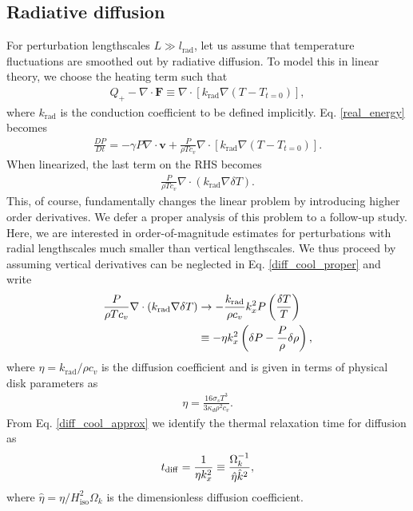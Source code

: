\subsection{Radiative diffusion}
For perturbation lengthscales $L\gg l_\mathrm{rad}$, let us assume that
temperature fluctuations are smoothed out by radiative diffusion. To
model this in linear theory, we choose the heating term such that
\begin{align}
  Q_+ - \nabla\cdot\bm{F} \equiv \nabla\cdot\left[k_\mathrm{rad}\nabla
    \left(T-T_{t=0}\right)\right], 
\end{align} 
where $k_\mathrm{rad}$ is the conduction coefficient to be defined
implicitly. Eq. \ref{real_energy} becomes
\begin{align}
  \frac{DP}{Dt} = -\gamma P \nabla\cdot\bm{v} + \frac{P}{\rho T
    c_v}\nabla\cdot\left[k_\mathrm{rad}\nabla\left(T-T_{t=0}\right)\right].     
\end{align}
When linearized, the last term on the RHS becomes
\begin{align}\label{diff_cool_proper}
  \frac{P}{\rho T c_v} \nabla\cdot\left(k_\mathrm{rad}\nabla\delta
    T\right). 
\end{align}
This, of course, fundamentally changes the linear problem by
introducing higher order derivatives. We defer a proper analysis of
this problem to a follow-up study. Here, we are interested in
order-of-magnitude estimates for perturbations with radial
lengthscales much smaller than vertical lengthscales. We thus proceed
by assuming vertical derivatives can be neglected in
Eq. \ref{diff_cool_proper} and write  
\begin{align}\label{diff_cool_approx}
  \frac{P}{\rho T c_v} \nabla\cdot\left(k_\mathrm{rad}\nabla\delta
    T\right) &\to -\frac{k_\mathrm{rad}}{\rho
    c_v}k_x^2P\left(\frac{\delta T}{T}\right)\notag\\
  &\equiv -\eta k_x^2 \left(\delta P - \frac{P}{\rho}\delta\rho\right), 
\end{align}
where $\eta=k_\mathrm{rad}/\rho c_v$ is the diffusion coefficient and
is given in terms of physical disk parameters as 
\begin{align}\label{eta_def}
  \eta = \frac{16\sigma_s T^3}{3\kappa_d\rho^2 c_v}. 
\end{align}
From Eq. \ref{diff_cool_approx} we identify the thermal relaxation
time for diffusion as 
\begin{align}\label{tc_diff_cool} 
  t_\mathrm{diff} = \frac{1}{\eta k_x^2}\equiv \frac{\Omega_k^{-1}}{\hat{\eta}\hat{k}^2}, 
\end{align}
where $\hat{\eta} = \eta/H_\mathrm{iso}^2\Omega_k$ is the 
dimensionless diffusion coefficient.

